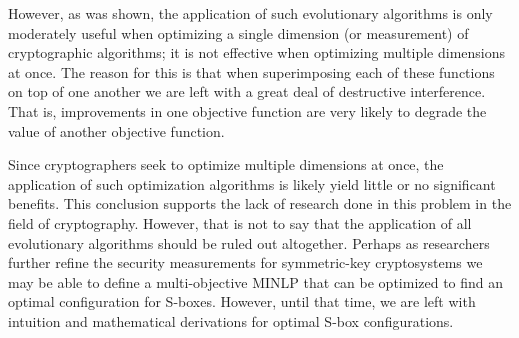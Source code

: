 \documentclass[11pt]{article}
\begin{document}
However, as was shown, the application of such evolutionary algorithms is only moderately useful when optimizing a single dimension (or measurement) of cryptographic algorithms; it is not effective when optimizing multiple dimensions at once. The reason for this is that when superimposing each of these functions on top of one another we are left with a great deal of destructive interference. That is, improvements in one objective function are very likely to degrade the value of another objective function.

Since cryptographers seek to optimize multiple dimensions at once, the application of such optimization algorithms is likely yield little or no significant benefits. This conclusion supports the lack of research done in this problem in the field of cryptography. However, that is not to say that the application of all evolutionary algorithms should be ruled out altogether. Perhaps as researchers further refine the security measurements for symmetric-key cryptosystems we may be able to define a multi-objective MINLP that can be optimized to find an optimal configuration for S-boxes. However, until that time, we are left with intuition and mathematical derivations for optimal S-box configurations.



\end{document}
